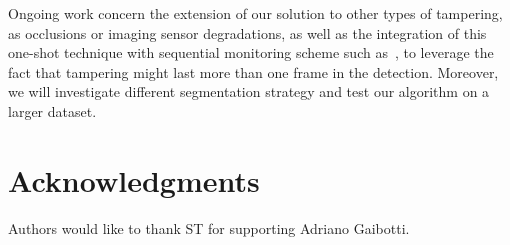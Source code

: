\documentclass{llncs}
\begin{document}
Ongoing work concern the extension of our solution to other types of tampering, as occlusions or imaging sensor degradations, as well as the integration of this one-shot technique with sequential monitoring scheme such as~\cite{alippi2010detecting}, to leverage the fact that tampering might last more than one frame in the detection. Moreover, we will investigate different segmentation strategy and test our algorithm on a larger dataset.




\section*{Acknowledgments}\label{sec:Acknowledgments}
Authors would like to thank ST for supporting Adriano Gaibotti.




%	
%	
\end{document}
